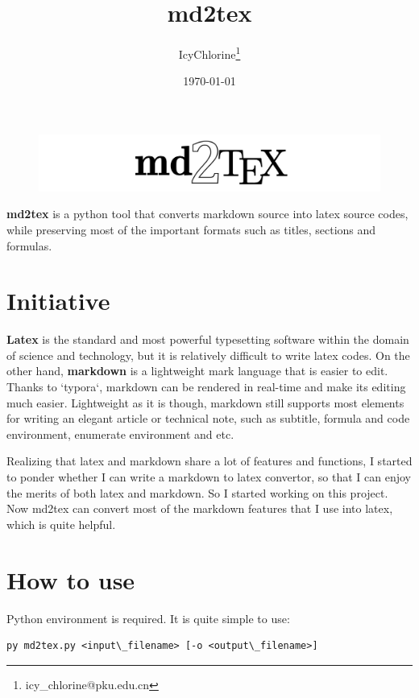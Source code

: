 \documentclass[UTF8]{ctexart}
\title{md2tex}
\author{IcyChlorine\footnote{icy\_chlorine@pku.edu.cn}}
\date{\today}
\begin{document}
	\maketitle


\begin{figure}[H]
	\centering
	\includegraphics[width=1.\textwidth]{md2tex.png}
	\caption{}
\end{figure}


\textbf{md2tex} is a python tool that converts markdown source into latex source codes, while preserving most of the important formats such as titles, sections and formulas.

\section{Initiative}

\textbf{Latex} is the standard and most powerful typesetting software within the domain of science and technology, but it is relatively difficult to write latex codes. On the other hand, \textbf{markdown} is a lightweight mark language that is easier to edit. Thanks to `typora`, markdown can be rendered in real-time and make its editing much easier. Lightweight as it is though, markdown still supports most elements for writing an elegant article or technical note, such as subtitle, formula and code environment, enumerate environment and etc. 

Realizing that latex and markdown share a lot of features and functions, I started to ponder whether I can write a markdown to latex convertor, so that I can enjoy the merits of both latex and markdown. So I started working on this project. Now md2tex can convert most of the markdown features that I use into latex, which is quite helpful.

\section{How to use}

Python environment is required. It is quite simple to use: 

\begin{lstlisting}
py md2tex.py <input\_filename> [-o <output\_filename>]
\end{lstlisting}
\end{document}
